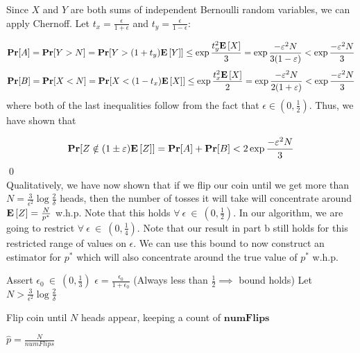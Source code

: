 \documentclass[12pt]{article}
\begin{document}
\begin{solution}
Since $X$ and $Y$ are both sums of independent Bernoulli random variables, we can apply Chernoff. Let $t_x = \frac{\epsilon}{1 + \epsilon}$ and $t_y = \frac{\epsilon}{1 - \epsilon}$:

\[
\textbf{Pr}[A] = \textbf{Pr}[Y > N] = \textbf{Pr}[Y > (1+t_y)\mathbf{E}\left[Y\right]] \leq \exp{\frac{t_{y}^2\mathbf{E}\left[X\right]}{3}} = \exp{{\frac{-\varepsilon^2N}{3(1 -\varepsilon)}}} < \exp{{\frac{-\varepsilon^2N}{3}}}
\]
\[
\textbf{Pr}[B] = \textbf{Pr}[X <  N] = \textbf{Pr}[X < (1-t_x)\mathbf{E}\left[X\right]] \leq \exp{\frac{t_{x}^2\mathbf{E}\left[X\right]}{2}} = \exp{{\frac{-\varepsilon^2N}{2(1 + \varepsilon)}}} < \exp{{\frac{-\varepsilon^2N}{3}}}
\]
where both of the last inequalities follow from the fact that $\epsilon \in (0,\frac{1}{2})$. Thus, we have shown that 

\[
\textbf{Pr}[Z \notin (1 \pm \varepsilon)\mathbf{E}\left[Z\right]]=  \textbf{Pr}[A] + \textbf{Pr}[B] < 2\exp{{\frac{-\varepsilon^2N}{3}}}
\]
\qed\\
Qualitatively, we have now shown that if we flip our coin until we get more than $N=\frac{3}{\epsilon^2}\log{\frac{2}{\delta}} $ heads, then the number of tosses it will take will concentrate around $\mathbf{E}\left[Z\right] = \frac{N}{p^*}$ w.h.p. Note that this holds $\forall~\epsilon~\in~(0,\frac{1}{2})$. In our algorithm, we are going to restrict $\forall~\epsilon~\in~(0,\frac{1}{4})$. Note that our result in part b still holds for this restricted range of values on $\epsilon$. We can use this bound to now construct an estimator for $p^*$ which will also concentrate around the true value of $p^*$ w.h.p.

\begin{answerbox}
\begin{algorithmic}
\State Assert $\epsilon_0~\in~(0,\frac{1}{3})$
\State $\epsilon = \frac{\epsilon_0}{1 + \epsilon_0}$ (Always less than $\frac{1}{2} \implies$ bound holds)
\State Let $N > \frac{3}{\epsilon^2}\log{\frac{2}{\delta}}$

\State Flip coin until $N$ heads appear, keeping a count of $\textbf{numFlips}$

\State $\hat{p} = \frac{N}{numFlips}$

\State {}


\end{algorithmic}
\end{answerbox}
\end{solution}
\end{document}
